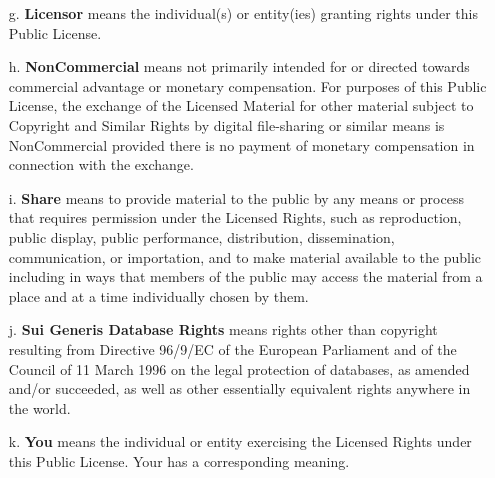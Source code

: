 \begin{itemize}
\item[g.] \textbf{Licensor} means the individual(s) or entity(ies) granting rights under this Public License.

\item[h.] \textbf{NonCommercial} means not primarily intended for or directed towards commercial advantage or monetary compensation. For purposes of this Public License, the exchange of the Licensed Material for other material subject to Copyright and Similar Rights by digital file-sharing or similar means is NonCommercial provided there is no payment of monetary compensation in connection with the exchange.

\item[i.] \textbf{Share} means to provide material to the public by any means or process that requires permission under the Licensed Rights, such as reproduction, public display, public performance, distribution, dissemination, communication, or importation, and to make material available to the public including in ways that members of the public may access the material from a place and at a time individually chosen by them.

\item[j.] \textbf{Sui Generis Database Rights} means rights other than copyright resulting from Directive 96/9/EC of the European Parliament and of the Council of 11 March 1996 on the legal protection of databases, as amended and/or succeeded, as well as other essentially equivalent rights anywhere in the world.

\item[k.] \textbf{You} means the individual or entity exercising the Licensed Rights under this Public License. Your has a corresponding meaning.
\end{itemize}


